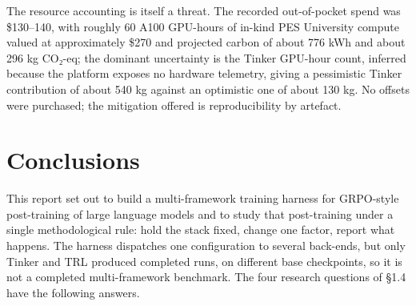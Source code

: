 \documentclass[12pt,a4paper]{report}
\begin{document}
The resource accounting is itself a threat. The recorded out-of-pocket
spend was \$130--140, with roughly 60 A100 GPU-hours of in-kind PES
University compute valued at approximately \$270 and projected carbon of
about 776 kWh and about 296 kg CO₂-eq; the dominant uncertainty is the
Tinker GPU-hour count, inferred because the platform exposes no hardware
telemetry, giving a pessimistic Tinker contribution of about 540 kg
against an optimistic one of about 130 kg. No offsets were purchased;
the mitigation offered is reproducibility by artefact.

\section{Conclusions}\label{conclusions}

This report set out to build a multi-framework training harness for
GRPO-style post-training of large language models and to study that
post-training under a single methodological rule: hold the stack fixed,
change one factor, report what happens. The harness dispatches one
configuration to several back-ends, but only Tinker and TRL produced
completed runs, on different base checkpoints, so it is not a completed
multi-framework benchmark. The four research questions of §1.4 have the
following answers.
\end{document}
